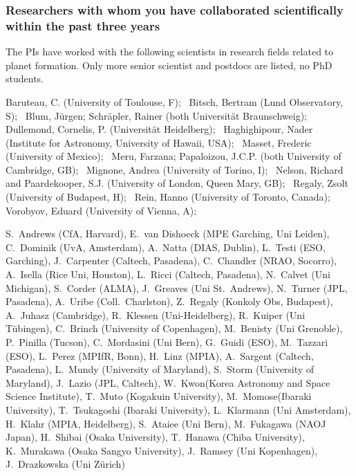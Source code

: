 \documentclass[10pt,fleqn,twoside]{article}
\begin{document}
\subsubsection{Researchers with whom you have collaborated scientifically within the past three years}
The PIs have worked with the following scientists in research fields related to planet formation.
Only more senior scientist and postdocs are listed, no PhD students.

Baruteau, C. (University of Toulouse, F); \,
Bitsch, Bertram (Lund Observatory, S); \,
Blum, J\"urgen; Schr\"apler, Rainer (both Universit\"at Braunschweig); \,
Dullemond, Cornelis, P. (Universit\"at Heidelberg); \,
Haghighipour, Nader (Institute for Astronomy, University of Hawaii, USA); \,
Masset, Frederic (University of Mexico); \,
Meru, Farzana; Papaloizou, J.C.P. (both University of Cambridge, GB); \,
Mignone, Andrea (University of Torino, I); \,
Nelson, Richard and Paardekooper, S.J. (University of London, Queen Mary, GB); \,
Regaly, Zsolt (University of Budapest, H); \,
Rein, Hanno (University of Toronto, Canada); \,
Vorobyov, Eduard (University of Vienna, A); \,

S.~Andrews (CfA, Harvard),
E.~van Dishoeck (MPE Garching, Uni Leiden),
C.~Dominik (UvA, Amsterdam),
A.~Natta (DIAS, Dublin),
L.~Testi (ESO, Garching),
J.~Carpenter (Caltech, Pasadena),
C.~Chandler (NRAO, Socorro),
A.~Isella (Rice Uni, Houston),
L.~Ricci (Caltech, Pasadena),
N.~Calvet (Uni Michigan),
S.~Corder (ALMA),
J.~Greaves (Uni St.~Andrews),
N.~Turner (JPL, Pasadena),
A.~Uribe (Coll.~Charlston),
Z.~Regaly (Konkoly Obs, Budapest),
A.~Juhasz (Cambridge),
R.~Klessen (Uni-Heidelberg),
R.~Kuiper (Uni T\"ubingen),
C.~Brinch (University of Copenhagen),
M.~Benisty (Uni Grenoble),
P.~Pinilla (Tucson),
C.~Mordasini (Uni Bern),
G.~Guidi (ESO),
M.~Tazzari (ESO),
L.~Perez (MPIfR, Bonn),
H.~Linz (MPIA),
A.~Sargent (Caltech, Pasadena),
L.~Mundy (University of Maryland),
S.~Storm (University of Maryland),
J.~Lazio (JPL, Caltech),
W.~Kwon(Korea Astronomy and Space Science Institute),
T.~Muto (Kogakuin University),
M.~Momose(Ibaraki University),
T.~Tsukagoshi (Ibaraki University),
L.~Klarmann (Uni Amsterdam),
H.~Klahr (MPIA, Heidelberg),
S.~Ataiee (Uni Bern),
M.~Fukagawa (NAOJ Japan),
H.~Shibai (Osaka University),
T.~Hanawa (Chiba University),
K.~Murakawa (Osaka Sangyo University),
J.~Ramsey (Uni Kopenhagen),
J.~Drazkowska (Uni Z\"urich)
\end{document}
